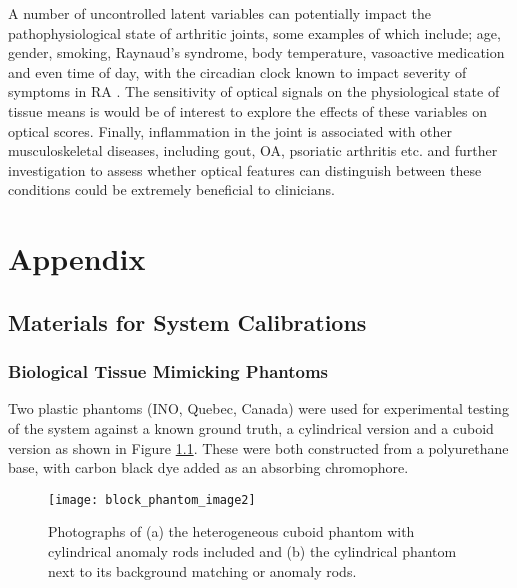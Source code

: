 \documentclass[twoside]{bhamthesis}
\theoremstyle{definition}
\begin{document}
A number of uncontrolled latent variables can potentially impact the pathophysiological state of arthritic joints, some examples of which include; age, gender, smoking, Raynaud's syndrome, body temperature, vasoactive medication and even time of day, with the circadian clock known to impact severity of symptoms in RA \cite{gibbs2013role}. The sensitivity of optical signals on the physiological state of tissue means is would be of interest to explore the effects of these variables on optical scores. Finally, inflammation in the joint is associated with other musculoskeletal diseases, including gout, OA, psoriatic arthritis etc. and further investigation to assess whether optical features can distinguish between these conditions could be extremely beneficial to clinicians.

\clearpage
\appendix
\chapter{Appendix}

\section{Materials for System Calibrations}

\subsection{Biological Tissue Mimicking Phantoms}

\label{appendix:Biological_Tissue_Mimicking_Phantoms}

Two plastic phantoms (INO, Quebec, Canada) were used for experimental testing of the system against a known ground truth, a cylindrical version and a cuboid version as shown in Figure \ref{fig:block_phantom_image}. These were both constructed from a polyurethane base, with carbon black dye added as an absorbing chromophore. 

\begin{figure}[!ht]
\centering
  \centering
  \texttt{[image: block\_phantom\_image2]}
  \caption{Photographs of (a) the heterogeneous cuboid phantom with cylindrical anomaly rods included and (b) the cylindrical phantom next to its background matching or anomaly rods.}
  \label{fig:block_phantom_image}
\end{figure}
\end{document}
